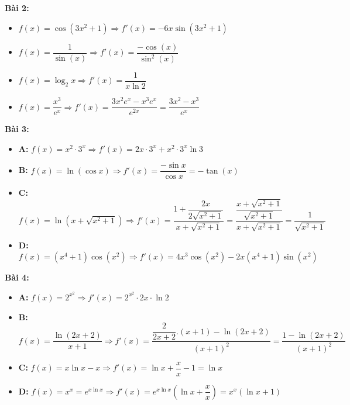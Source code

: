 \documentclass[12pt,a4paper]{article}
\begin{document}
\textbf{Bài 2:}
\begin{itemize}
\item $f(x) = \cos(3x^2+1) \Rightarrow f'(x) = -6x\sin(3x^2+1)$
\item $f(x) = \dfrac{1}{\sin(x)} \Rightarrow f'(x) = \dfrac{-\cos(x)}{\sin^2(x)}$
\item $f(x) = \log_2 x \Rightarrow f'(x) = \dfrac{1}{x\ln 2}$
\item $f(x) = \dfrac{x^3}{e^x} \Rightarrow f'(x) = \dfrac{3x^2e^x-x^3e^x}{e^{2x}} = \dfrac{3x^2-x^3}{e^x}$
\end{itemize}

\textbf{Bài 3:}

\begin{itemize}
    \item \textbf{A:} $f(x)=x^2\cdot 3^x \Rightarrow f'(x)=2x\cdot 3^x+x^2\cdot 3^x\ln 3$
    \item \textbf{B:} $f(x)=\ln(\cos x) \Rightarrow f'(x)= \dfrac{-\sin x}{\cos x} = -\tan(x)$
    \item \textbf{C:} $f(x)=\ln(x+\sqrt{x^2+1}) \Rightarrow f'(x) = \dfrac{1 + \dfrac{2x}{2\sqrt{x^2 + 1}}}{x + \sqrt{x^2 + 1}} = \dfrac{\dfrac{x + \sqrt{x^2 + 1}}{\sqrt{x^2 + 1}}}{x + \sqrt{x^2 + 1}} = \dfrac{1}{\sqrt{x^2+1}}$
    \item \textbf{D:} $f(x)=(x^4+1)\cos(x^2) \Rightarrow f'(x) = 4x^3\cos(x^2)-2x(x^4+1)\sin(x^2)$
\end{itemize}

\textbf{Bài 4:}
\begin{itemize}
\item \textbf{A:} $f(x)=2^{x^2} \Rightarrow f'(x)=2^{x^2}\cdot 2x\cdot\ln 2$
\item \textbf{B:} $f(x)=\dfrac{\ln(2x+2)}{x+1} \Rightarrow f'(x) = \dfrac{\dfrac{2}{2x + 2}.(x + 1) - \ln (2x + 2)}{(x + 1)^2} = \dfrac{1-\ln(2x+2)}{(x+1)^2}$
\item \textbf{C:} $f(x)=x\ln x - x \Rightarrow f'(x) = \ln x + \dfrac{x}{x} - 1 = \ln x$
\item \textbf{D:} $f(x)=x^x = e^{x \ln x} \Rightarrow f'(x) = e^{x \ln x} (\ln x + \dfrac{x}{x}) = x^x(\ln x+1)$
\end{itemize}
\end{document}
